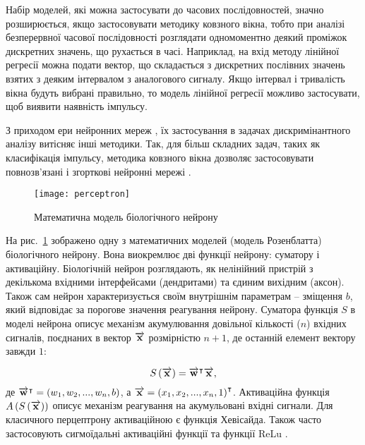 
Набір моделей, які можна застосувати до часових послідовностей, значно 
розширюється, якщо застосовувати методику ковзного вікна, тобто при аналізі 
безперервної часової послідовності розглядати одномоментно деякий проміжок 
дискретних значень, що рухається в часі. Наприклад, на вхід методу лінійної 
регресії \cite{imp:Xin2009} можна подати вектор, що складається з дискретних 
послівних значень взятих з деяким інтервалом з аналогового сигналу. Якщо 
інтервал і тривалість вікна будуть вибрані правильно, то модель лінійної
регресії можливо застосувати, щоб виявити наявність імпульсу. 

З приходом ери нейронних мереж \cite{imp:Rosenblatt1957}, їх застосування в
задачах дискримінантного аналізу витісняє інші методики. Так, для більш 
складних задач, таких як класифікація імпульсу, методика ковзного вікна 
дозволяє застосовувати повнозв'язані і згорткові нейронні мережі 
\cite{imp:Plakhtii2019}.

\begin{figure}[htbp] \begin{center}
\texttt{[image: perceptron]}
\caption{Математична модель біологічного нейрону}
\label{fig:perceptron}
\end{center} \end{figure}

На рис.~\ref{fig:perceptron} зображено одну з математичних моделей (модель 
Розенблатта) біологічного нейрону. Вона виокремлює дві функції нейрону: 
суматору і активаційну. Біологічній нейрон розглядають, як нелінійний пристрій 
з декількома вхідними інтерфейсами (дендритами) та єдиним вихідним (аксон).
Також сам нейрон характеризується своїм внутрішнім параметрам -- зміщення 
$ b $, який відповідає за порогове значення реагування нейрону. Суматора 
функція $ S $ в моделі нейрона описує механізм акумулювання довільної 
кількості ($ n $) вхідних сигналів, поєднаних в вектор $ \overrightarrow{\mathbf x} $ 
розмірністю $ n + 1 $, де останній елемент вектору завжди $ 1 $:

\begin{equation}
S \left( \overrightarrow{\mathbf x} \right) = \overrightarrow{\mathbf w}^\intercal \overrightarrow{\mathbf x},
\end{equation}
%
де $ \overrightarrow{\mathbf w}^\intercal = \left( w_1, w_2, ..., w_n, b \right) $, а
$ \overrightarrow{\mathbf x} = \left( x_1, x_2, ..., x_n, 1 \right)^\intercal $.
Активаційна функція $ A \left( S \left( \overrightarrow{\mathbf x} \right) \right) $ описує механізм 
реагування на акумульовані вхідні сигнали. Для класичного перцептрону 
активаційною є функція Хевісайда. Також часто застосовують сигмоїдальні 
активаційні функції та функції ReLu \cite{imp:Kussul2004}.


